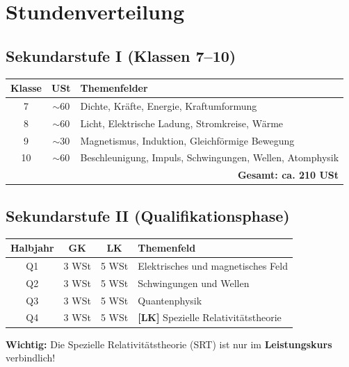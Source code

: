 \documentclass[11pt,a4paper]{article}
\newcommand{\lmark}{\textcolor{accentorange}{\textbf{[LK]}}}
\begin{document}
\section{Stundenverteilung}

\subsection{Sekundarstufe I (Klassen 7--10)}

\begin{center}
\begin{tabular}{c|c|l}
\rowcolor{lightblue}
\textbf{Klasse} & \textbf{USt} & \textbf{Themenfelder} \\
\hline
7 & $\sim$60 & Dichte, Kräfte, Energie, Kraftumformung \\
\rowcolor{lightgray}
8 & $\sim$60 & Licht, Elektrische Ladung, Stromkreise, Wärme \\
9 & $\sim$30 & Magnetismus, Induktion, Gleichförmige Bewegung \\
\rowcolor{lightgray}
10 & $\sim$60 & Beschleunigung, Impuls, Schwingungen, Wellen, Atomphysik \\
\hline
\multicolumn{3}{r}{\textbf{Gesamt: ca. 210 USt}} \\
\end{tabular}
\end{center}

\subsection{Sekundarstufe II (Qualifikationsphase)}

\begin{center}
\begin{tabular}{c|c|c|l}
\rowcolor{lightblue}
\textbf{Halbjahr} & \textbf{GK} & \textbf{LK} & \textbf{Themenfeld} \\
\hline
Q1 & 3 WSt & 5 WSt & Elektrisches und magnetisches Feld \\
\rowcolor{lightgray}
Q2 & 3 WSt & 5 WSt & Schwingungen und Wellen \\
Q3 & 3 WSt & 5 WSt & Quantenphysik \\
\rowcolor{lightgray}
Q4 & 3 WSt & 5 WSt & \lmark{} Spezielle Relativitätstheorie \\
\hline
\end{tabular}
\end{center}

\begin{wichtigbox}
\textbf{Wichtig:} Die Spezielle Relativitätstheorie (SRT) ist nur im \textbf{Leistungskurs} verbindlich!
\end{wichtigbox}
\end{document}

